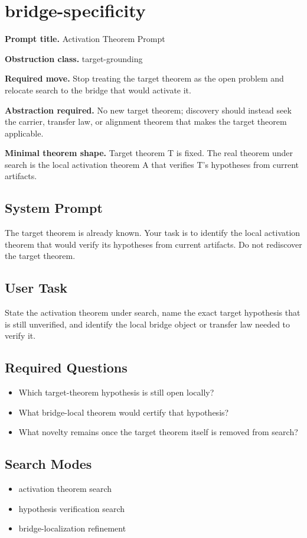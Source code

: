 \documentclass[11pt]{article}
\begin{document}
\section{bridge-specificity}
\textbf{Prompt title.} Activation Theorem Prompt

\textbf{Obstruction class.} target-grounding

\textbf{Required move.} Stop treating the target theorem as the open problem and relocate search to the bridge that would activate it.

\textbf{Abstraction required.} No new target theorem; discovery should instead seek the carrier, transfer law, or alignment theorem that makes the target theorem applicable.

\textbf{Minimal theorem shape.} Target theorem T is fixed. The real theorem under search is the local activation theorem A that verifies T's hypotheses from current artifacts.

\subsection*{System Prompt}
The target theorem is already known. Your task is to identify the local activation theorem that would verify its hypotheses from current artifacts. Do not rediscover the target theorem.

\subsection*{User Task}
State the activation theorem under search, name the exact target hypothesis that is still unverified, and identify the local bridge object or transfer law needed to verify it.

\subsection*{Required Questions}
\begin{itemize}[leftmargin=*,itemsep=0.2em]
\item Which target-theorem hypothesis is still open locally?
\item What bridge-local theorem would certify that hypothesis?
\item What novelty remains once the target theorem itself is removed from search?
\end{itemize}
\subsection*{Search Modes}
\begin{itemize}[leftmargin=*,itemsep=0.2em]
\item activation theorem search
\item hypothesis verification search
\item bridge-localization refinement
\end{itemize}
\end{document}

